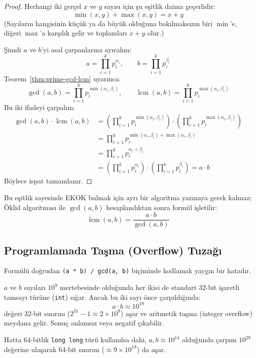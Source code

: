\begin{proof}
Herhangi iki gerçel $x$ ve $y$ sayısı için şu eşitlik daima geçerlidir:
\[ \min(x, y) + \max(x, y) = x + y \]
(Sayıların hangisinin küçük ya da büyük olduğuna bakılmaksızın biri $\min$'e, diğeri $\max$'a karşılık gelir ve toplamları $x+y$ olur.)

Şimdi $a$ ve $b$'yi asal çarpanlarına ayıralım:
\[ a = \prod_{i=1}^k p_i^{\alpha_i}, \qquad b = \prod_{i=1}^k p_i^{\beta_i} \]
Teorem~\ref{thm:prime-gcd-lcm} uyarınca:
\[ \gcd(a, b) = \prod_{i=1}^k p_i^{\min(\alpha_i, \beta_i)}, \qquad \operatorname{lcm}(a, b) = \prod_{i=1}^k p_i^{\max(\alpha_i, \beta_i)} \]
Bu iki ifadeyi çarpalım:
\begin{align*}
    \gcd(a, b) \cdot \operatorname{lcm}(a, b) &= \left( \prod_{i=1}^k p_i^{\min(\alpha_i, \beta_i)} \right) \cdot \left( \prod_{i=1}^k p_i^{\max(\alpha_i, \beta_i)} \right) \\
    &= \prod_{i=1}^k p_i^{\min(\alpha_i, \beta_i) + \max(\alpha_i, \beta_i)} \\
    &= \prod_{i=1}^k p_i^{\alpha_i + \beta_i} \\
    &= \left( \prod_{i=1}^k p_i^{\alpha_i} \right) \cdot \left( \prod_{i=1}^k p_i^{\beta_i} \right) = a \cdot b
\end{align*}
Böylece ispat tamamlanır.
\end{proof}

Bu eşitlik sayesinde EKOK bulmak için ayrı bir algoritma yazmaya gerek kalmaz; Öklid algoritması ile $\gcd(a, b)$ hesaplandıktan sonra formül işletilir:
\[ \operatorname{lcm}(a, b) = \frac{a \cdot b}{\gcd(a, b)} \]

\subsection*{Programlamada Taşma (Overflow) Tuzağı}

Formülü doğrudan \texttt{(a * b) / gcd(a, b)} biçiminde kodlamak yaygın bir hatadır.

$a$ ve $b$ sayıları $10^9$ mertebesinde olduğunda her ikisi de standart 32-bit işaretli tamsayı türüne (\texttt{int}) sığar. Ancak bu iki sayı önce çarpıldığında:
\[ a \cdot b \approx 10^{18} \]
değeri 32-bit sınırını ($2^{31}-1 \approx 2 \times 10^9$) aşar ve aritmetik taşma (integer overflow) meydana gelir. Sonuç anlamsız veya negatif çıkabilir.

Hatta 64-bitlik \texttt{long long} türü kullanılsa dahi, $a, b \approx 10^{14}$ olduğunda çarpım $10^{28}$ değerine ulaşarak 64-bit sınırını ($\approx 9 \times 10^{18}$) da aşar.

